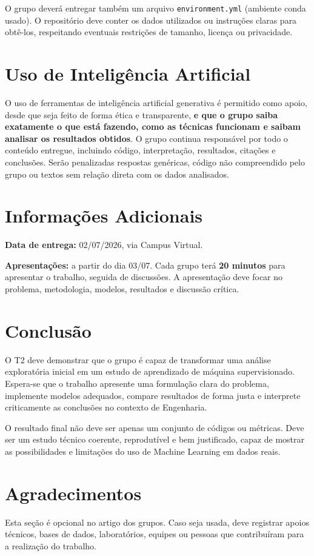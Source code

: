 \documentclass[a4paper]{ifacconf}
\begin{document}
O grupo deverá entregar também um arquivo \texttt{environment.yml} (ambiente conda usado). O repositório deve conter os dados utilizados ou instruções claras para obtê-los, respeitando eventuais restrições de tamanho, licença ou privacidade.

\section{Uso de Inteligência Artificial}

O uso de ferramentas de inteligência artificial generativa é permitido como apoio, desde que seja feito de forma ética e transparente, \textbf{e que o grupo saiba exatamente o que está fazendo, como as técnicas funcionam e saibam analisar os resultados obtidos}. O grupo continua responsável por todo o conteúdo entregue, incluindo código, interpretação, resultados, citações e conclusões. Serão penalizadas respostas genéricas, código não compreendido pelo grupo ou textos sem relação direta com os dados analisados.

\section{Informações Adicionais}

\textbf{Data de entrega:} 02/07/2026, via Campus Virtual.

\textbf{Apresentações:} a partir do dia 03/07. Cada grupo terá \textbf{20 minutos} para apresentar o trabalho, seguida de discussões. A apresentação deve focar no problema, metodologia, modelos, resultados e discussão crítica.

\section{Conclusão}

O T2 deve demonstrar que o grupo é capaz de transformar uma análise exploratória inicial em um estudo de aprendizado de máquina supervisionado. Espera-se que o trabalho apresente uma formulação clara do problema, implemente modelos adequados, compare resultados de forma justa e interprete criticamente as conclusões no contexto de Engenharia.

O resultado final não deve ser apenas um conjunto de códigos ou métricas. Deve ser um estudo técnico coerente, reprodutível e bem justificado, capaz de mostrar as possibilidades e limitações do uso de Machine Learning em dados reais.

\section*{Agradecimentos}

Esta seção é opcional no artigo dos grupos. Caso seja usada, deve registrar apoios técnicos, bases de dados, laboratórios, equipes ou pessoas que contribuíram para a realização do trabalho.

\nocite{grus2020,muller2016,geron2020,nielsen2021,pedregosa2011,lacerda2020}

\end{document}
